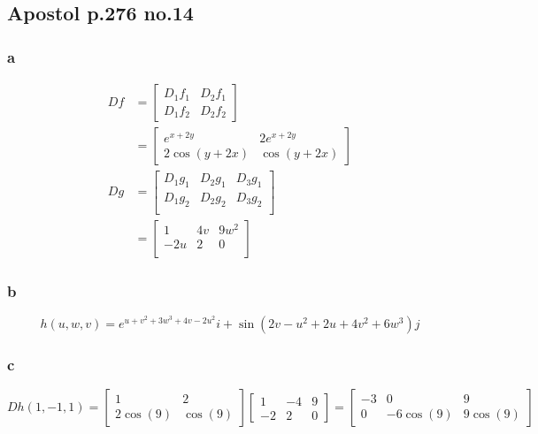 \documentclass[12pt,letterpaper]{article}
\theoremstyle{definition}
\begin{document}
\subsection*{Apostol p.276 no.14}

\subsubsection*{a}

\begin{align*}
  Df &=
       \begin{bmatrix}
         D_1f_1 & D_2f_1 \\
         D_1f_2 & D_2f_2
       \end{bmatrix} \\
     &=
       \begin{bmatrix}
         e^{x + 2y} &  2e^{x + 2y}\\
         2\cos(y + 2x) & \cos(y + 2x)
       \end{bmatrix} \\
  Dg &=
       \begin{bmatrix}
         D_1g_1 & D_2g_1 & D_3g_1 \\
         D_1g_2 & D_2g_2 & D_3g_2\\
       \end{bmatrix} \\
     &=
       \begin{bmatrix}
         1 & 4v & 9w^2 \\
         -2u & 2 & 0 \\
       \end{bmatrix}
\end{align*}

\subsubsection*{b}

\[
  h(u,w,v) = e^{u + v^2 + 3w^3 + 4v - 2u^2}i + \sin(2v - u^2 + 2u + 4v^2 + 6w^3)j
\]

\subsubsection*{c}

\[
  Dh(1, -1, 1) =
  \begin{bmatrix}
    1 & 2 \\
    2\cos(9) & \cos(9)
  \end{bmatrix}
  \begin{bmatrix}
    1 & -4 & 9 \\
    -2 & 2 & 0
  \end{bmatrix} =
  \begin{bmatrix}
    -3 & 0 & 9 \\
    0 & -6\cos(9) & 9\cos(9)
  \end{bmatrix}
\]
\end{document}
